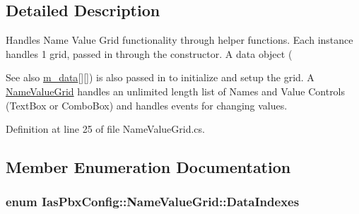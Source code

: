 \subsection{Detailed Description}
Handles Name Value Grid functionality through helper functions. Each instance handles 1 grid, passed in through the constructor. A data object (\begin{DoxySeeAlso}{See also}
\hyperlink{class_ias_pbx_config_1_1_name_value_grid_a816a0c9ece3edb83afb39863e1f843b4}{m\_\-data}\mbox{[}\mbox{]}\mbox{[}\mbox{]}) is also passed in to initialize and setup the grid. A \hyperlink{class_ias_pbx_config_1_1_name_value_grid}{NameValueGrid} handles an unlimited length list of Names and Value Controls (TextBox or ComboBox) and handles events for changing values. 
\end{DoxySeeAlso}


Definition at line 25 of file NameValueGrid.cs.

\subsection{Member Enumeration Documentation}
\hypertarget{class_ias_pbx_config_1_1_name_value_grid_ad252779c8bb45743ebf71025b284957e}{
\subsubsection[{DataIndexes}]{\setlength{\rightskip}{0pt plus 5cm}enum {\bf IasPbxConfig::NameValueGrid::DataIndexes}}}
\label{class_ias_pbx_config_1_1_name_value_grid_ad252779c8bb45743ebf71025b284957e}


